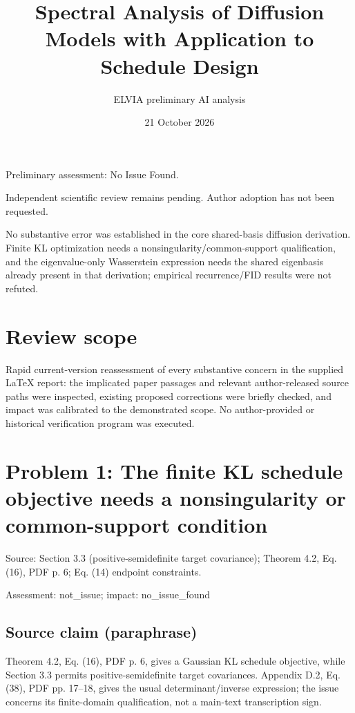 \documentclass[11pt]{article}
\begin{document}
\title{Spectral Analysis of Diffusion Models with Application to Schedule Design}

\author{ELVIA preliminary AI analysis}\date{21 October 2026}\maketitle

Preliminary assessment: No Issue Found.\par

Independent scientific review remains pending. Author adoption has not been requested.

No substantive error was established in the core shared-basis diffusion derivation. Finite KL optimization needs a nonsingularity/common-support qualification, and the eigenvalue-only Wasserstein expression needs the shared eigenbasis already present in that derivation; empirical recurrence/FID results were not refuted.

\section*{Review scope}

Rapid current-version reassessment of every substantive concern in the supplied LaTeX report: the implicated paper passages and relevant author-released source paths were inspected, existing proposed corrections were briefly checked, and impact was calibrated to the demonstrated scope. No author-provided or historical verification program was executed.

\section*{Problem 1: The finite KL schedule objective needs a nonsingularity or common-support condition}

Source: Section 3.3 (positive-semidefinite target covariance); Theorem 4.2, Eq. (16), PDF p. 6; Eq. (14) endpoint constraints.

Assessment: not\_issue; impact: no\_issue\_found

\subsection*{Source claim (paraphrase)}

Theorem 4.2, Eq. (16), PDF p. 6, gives a Gaussian KL schedule objective, while Section 3.3 permits positive-semidefinite target covariances. Appendix D.2, Eq. (38), PDF pp. 17–18, gives the usual determinant/inverse expression; the issue concerns its finite-domain qualification, not a main-text transcription sign.
\end{document}
